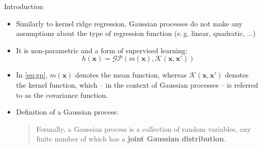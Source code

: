\begin{dwHeaderFrame}{Introduction}
	\begin{itemize}
		\item Similarly to kernel ridge regression, Gaussian processes do not make any assumptions about the type of regression function (e.\,g. linear, quadratic, ...)
		\item It is non-parametric and a form of supervised learning:
		\begin{equation}
			h(\bm{x}) = \mathcal{GP}(m(\bm{x}), \mathcal{K}(\bm{x}, \bm{x}'))
			\label{eq:gp}
		\end{equation}
		\item In \cref{eq:gp}, $m(\bm{x})$ denotes the mean function, whereas $\mathcal{K}(\bm{x}, \bm{x}')$ denotes the kernel function, which -- in the context of Gaussian processes -- is
			referred to as the covariance function.
		\item Definition of a Gaussian process:
		\begin{quote}
			Formally, a Gaussian process is a collection of random variables, any finite number of which has a \textbf{joint Gaussian distribution}.
		\end{quote}
	\end{itemize}
\end{dwHeaderFrame}


